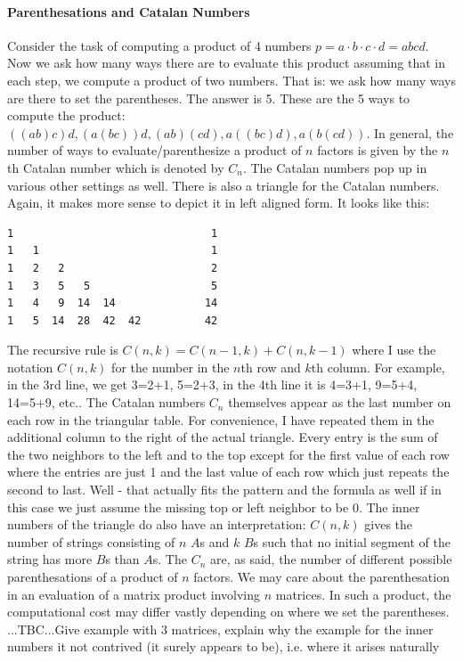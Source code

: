 \paragraph{Parenthesations and Catalan Numbers}
Consider the task of computing a product of 4 numbers $p = a \cdot b \cdot c  \cdot d = abcd$. Now we ask how many ways there are to evaluate this product assuming that in each step, we compute a product of two numbers. That is: we ask how many ways are there to set the parentheses. The answer is 5. These are the 5 ways to compute the product: $((ab)c)d, (a(bc))d, (ab)(cd), a((bc)d), a(b(cd))$. In general, the number of ways to evaluate/parenthesize a product of $n$ factors is given by the $n$th Catalan number which is denoted by $C_n$. The Catalan numbers pop up in various other settings as well. There is also a triangle for the Catalan numbers. Again, it makes more sense to depict it in left aligned form. It looks like this:
\begin{center}  %
\begin{verbatim}
1                               1
1   1                           1
1   2   2                       2
1   3   5   5                   5
1   4   9  14  14              14
1   5  14  28  42  42          42
\end{verbatim}
\end{center}
The recursive rule is $C(n,k) = C(n-1,k) + C(n,k-1)$ where I use the notation $C(n,k)$ for the number in the $n$th row and $k$th column. For example, in the 3rd line, we get 3=2+1, 5=2+3, in the 4th line it is 4=3+1, 9=5+4, 14=5+9, etc.. The Catalan numbers $C_n$ themselves appear as the last number on each row in the triangular table. For convenience, I have repeated them in the additional column to the right of the actual triangle. Every entry is the sum of the two neighbors to the left and to the top except for the first value of each row where the entries are just 1 and the last value of each row which just repeats the second to last. Well - that actually fits the pattern and the formula as well if in this case we just assume the missing top or left neighbor to be 0. The inner numbers of the triangle do also have an interpretation: $C(n,k)$ gives the number of strings consisting of $n$ $A$s and $k$ $B$s such that no initial segment of the string has more $B$s than $A$s. The $C_n$ are, as said, the number of different possible parenthesations of a product of $n$ factors. We may care about the parenthesation in an evaluation of a matrix product involving $n$ matrices. In such a product, the computational cost may differ vastly depending on where we set the parentheses. ...TBC...Give example with 3 matrices, explain why the example for the inner numbers it not contrived (it surely appears to be), i.e. where it arises naturally

